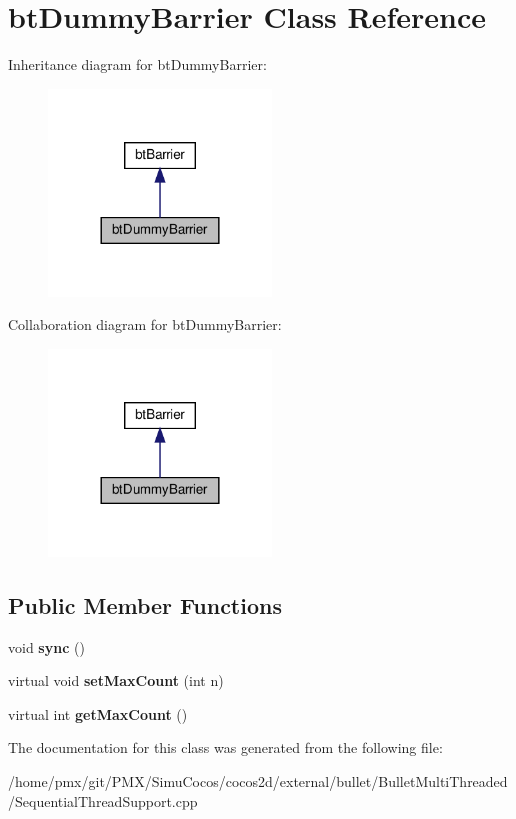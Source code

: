 \hypertarget{classbtDummyBarrier}{}\section{bt\+Dummy\+Barrier Class Reference}
\label{classbtDummyBarrier}


Inheritance diagram for bt\+Dummy\+Barrier\+:
\nopagebreak
\begin{figure}[H]
\begin{center}
\leavevmode
\includegraphics[width=168pt]{classbtDummyBarrier__inherit__graph}
\end{center}
\end{figure}


Collaboration diagram for bt\+Dummy\+Barrier\+:
\nopagebreak
\begin{figure}[H]
\begin{center}
\leavevmode
\includegraphics[width=168pt]{classbtDummyBarrier__coll__graph}
\end{center}
\end{figure}
\subsection*{Public Member Functions}
\begin{DoxyCompactItemize}
\item 
\mbox{\label{classbtDummyBarrier_a7ec421533b085380df3c7147bcfaa61c}} 
void {\bfseries sync} ()
\item 
\mbox{\label{classbtDummyBarrier_a44bb32b5a5e2feb46628c47491b731a1}} 
virtual void {\bfseries set\+Max\+Count} (int n)
\item 
\mbox{\label{classbtDummyBarrier_a0525b963816e305510dde5f8ea26e20b}} 
virtual int {\bfseries get\+Max\+Count} ()
\end{DoxyCompactItemize}


The documentation for this class was generated from the following file\+:\begin{DoxyCompactItemize}
\item 
/home/pmx/git/\+P\+M\+X/\+Simu\+Cocos/cocos2d/external/bullet/\+Bullet\+Multi\+Threaded/Sequential\+Thread\+Support.\+cpp\end{DoxyCompactItemize}

